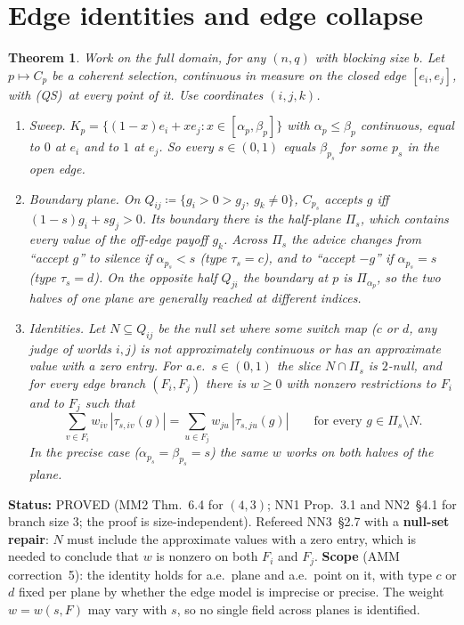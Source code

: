 \documentclass[11pt]{article}
\newtheorem{theorem}{Theorem}[section]
\theoremstyle{definition}
\theoremstyle{remark}
\newcommand{\src}[1]{\textsf{#1}}
\newcommand{\status}[1]{\par\smallskip\noindent\textbf{Status:} #1\par}
\newcommand{\QS}{\textup{(QS)}}
\begin{document}
\section{Edge identities and edge collapse}\label{sec:edges}

\begin{theorem}\label{thm:edge-identities}
Work on the full domain, for any $(n,q)$ with blocking size $b$. Let $p\mapsto C_p$ be a coherent selection, continuous in measure on the closed edge $[e_i,e_j]$, with \QS\ at every point of it. Use coordinates $(i,j,k)$.
\begin{enumerate}[label=(\alph*)]
\item \emph{Sweep.} $K_p=\{(1-x)e_i+xe_j:x\in[\alpha_p,\beta_p]\}$ with $\alpha_p\le\beta_p$ continuous, equal to $0$ at $e_i$ and to $1$ at $e_j$. So every $s\in(0,1)$ equals $\beta_{p_s}$ for some $p_s$ in the open edge.
\item \emph{Boundary plane.} On $Q_{ij}\coloneqq\{g_i>0>g_j,\ g_k\ne0\}$, $C_{p_s}$ accepts $g$ iff $(1-s)g_i+sg_j>0$. Its boundary there is the half-plane $\Pi_s$, which contains every value of the off-edge payoff $g_k$. Across $\Pi_s$ the advice changes from ``accept $g$'' to silence if $\alpha_{p_s}<s$ (type $\tau_s=c$), and to ``accept $-g$'' if $\alpha_{p_s}=s$ (type $\tau_s=d$). On the opposite half $Q_{ji}$ the boundary at $p$ is $\Pi_{\alpha_p}$, so the two halves of one plane are generally reached at different indices.
\item \emph{Identities.} Let $N\subseteq Q_{ij}$ be the null set where some switch map ($c$ or $d$, any judge of worlds $i,j$) is not approximately continuous \emph{or has an approximate value with a zero entry}. For a.e.\ $s\in(0,1)$ the slice $N\cap\Pi_s$ is $2$-null, and for every edge branch $(F_i,F_j)$ there is $w\ge0$ with nonzero restrictions to $F_i$ and to $F_j$ such that
\[
\sum_{v\in F_i}w_{iv}\,|\tau_{s,iv}(g)|=\sum_{u\in F_j}w_{ju}\,|\tau_{s,ju}(g)|\qquad\text{for every }g\in\Pi_s\setminus N.\tag{EI}
\]
In the precise case ($\alpha_{p_s}=\beta_{p_s}=s$) the same $w$ works on both halves of the plane.
\end{enumerate}
\end{theorem}
\status{PROVED (\src{MM2} Thm.~6.4 for $(4,3)$; \src{NN1} Prop.~3.1 and \src{NN2}~\S4.1 for branch size $3$; the proof is size-independent). Refereed \src{NN3}~\S2.7 with a \textbf{null-set repair}: $N$ must include the approximate values with a zero entry, which is needed to conclude that $w$ is nonzero on both $F_i$ and $F_j$. \textbf{Scope} (\src{AMM} correction~5): the identity holds for a.e.\ plane and a.e.\ point on it, with type $c$ or $d$ fixed per plane by whether the edge model is imprecise or precise. The weight $w=w(s,F)$ may vary with $s$, so no single field across planes is identified.}
\end{document}
